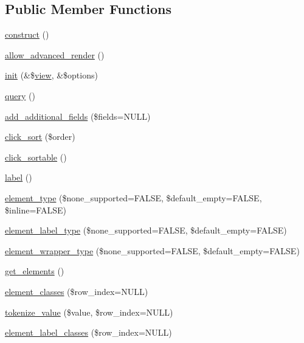 \subsection*{Public Member Functions}
\begin{DoxyCompactItemize}
\item 
\hyperlink{classviews__handler__field_a3d50050864c255b71c842972a45d39f6}{construct} ()
\item 
\hyperlink{classviews__handler__field_acdeb45612be43c2d58814726b35e55aa}{allow\_\-advanced\_\-render} ()
\item 
\hyperlink{classviews__handler__field_a3a290c7df3ead81e5cd244ad5335b1cc}{init} (\&\$\hyperlink{classview}{view}, \&\$options)
\item 
\hyperlink{classviews__handler__field_a4f661f91bcbe80d4a00c30a31456c502}{query} ()
\item 
\hyperlink{classviews__handler__field_a1590869371ef24a211e591a07ed5f7cb}{add\_\-additional\_\-fields} (\$fields=NULL)
\item 
\hyperlink{classviews__handler__field_a1c8cabe835ba05ed045c8f6eec6a36b8}{click\_\-sort} (\$order)
\item 
\hyperlink{classviews__handler__field_a22ef16d2b34823a3d12f273d34278b00}{click\_\-sortable} ()
\item 
\hyperlink{classviews__handler__field_a57c9be8a5a6a5f447c0320bf1a5378ee}{label} ()
\item 
\hyperlink{classviews__handler__field_a80ea5743144a8608145eb22d23a23d90}{element\_\-type} (\$none\_\-supported=FALSE, \$default\_\-empty=FALSE, \$inline=FALSE)
\item 
\hyperlink{classviews__handler__field_ac0ba0ea52c53f0695bfba23bd6fa627f}{element\_\-label\_\-type} (\$none\_\-supported=FALSE, \$default\_\-empty=FALSE)
\item 
\hyperlink{classviews__handler__field_a67d3b25f697d23c7fa457dbe9817dce8}{element\_\-wrapper\_\-type} (\$none\_\-supported=FALSE, \$default\_\-empty=FALSE)
\item 
\hyperlink{classviews__handler__field_af23aa556c6db633f0393390ba4ff190b}{get\_\-elements} ()
\item 
\hyperlink{classviews__handler__field_a80e76c44527962cc47a29d5dcdc7cd31}{element\_\-classes} (\$row\_\-index=NULL)
\item 
\hyperlink{classviews__handler__field_a81a30c2236091a1998399fe7ee416d7f}{tokenize\_\-value} (\$value, \$row\_\-index=NULL)
\item 
\hyperlink{classviews__handler__field_a7c31860b58425cbd34ffdf4b6ea98203}{element\_\-label\_\-classes} (\$row\_\-index=NULL)

\end{DoxyCompactItemize}
